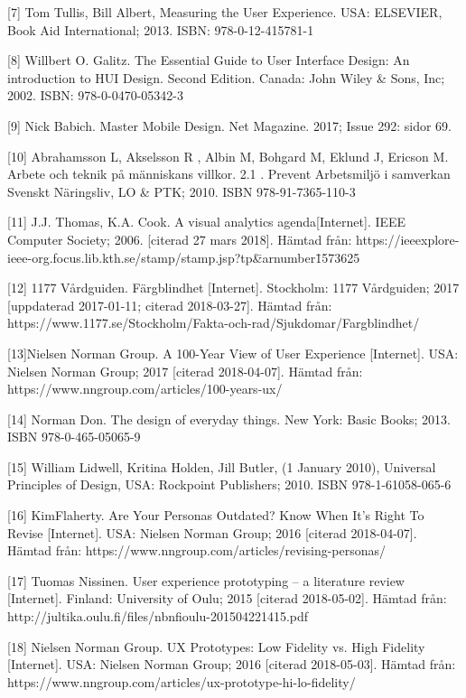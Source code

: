 \documentclass[12pt]{kththesis}
\begin{document}
[7] Tom Tullis, Bill Albert, Measuring the User Experience. USA: ELSEVIER, Book Aid International; 2013. ISBN: 978-0-12-415781-1

[8] Willbert O. Galitz. The Essential Guide to User Interface Design: An introduction to HUI Design. Second Edition. Canada: John Wiley \& Sons, Inc; 2002. ISBN: 978-0-0470-05342-3

[9] Nick Babich. Master Mobile Design. Net Magazine. 2017; Issue 292: sidor 69.         

[10] Abrahamsson L, Akselsson R , Albin M,  Bohgard M, Eklund J, Ericson M. Arbete och teknik på människans villkor. 2.1 . Prevent Arbetsmiljö i samverkan Svenskt Näringsliv, LO \& PTK; 2010. ISBN 978-91-7365-110-3

[11] J.J. Thomas, K.A. Cook. A visual analytics agenda[Internet]. IEEE Computer Society; 2006. [citerad 27 mars 2018]. Hämtad från: \newline
https://ieeexplore-ieee-org.focus.lib.kth.se\newline/stamp/stamp.jsp?tp\=\&arnumber\=1573625

[12] 1177 Vårdguiden. Färgblindhet [Internet]. Stockholm: 1177 Vårdguiden; 2017 [uppdaterad 2017-01-11; citerad 2018-03-27]. Hämtad från:\newline 
https://www.1177.se/Stockholm/Fakta-och-rad/Sjukdomar/Fargblindhet/

[13]Nielsen Norman Group. A 100-Year View of User Experience [Internet].  USA: Nielsen Norman Group; 2017 [citerad 2018-04-07]. Hämtad från:  https://www.nngroup.com/articles/100-years-ux/

[14] Norman Don. The design of everyday things. New York: Basic Books; 2013. ISBN 978-0-465-05065-9 

[15] William Lidwell, Kritina Holden, Jill Butler, (1 January 2010), Universal Principles of Design, USA: Rockpoint Publishers; 2010. ISBN 978-1-61058-065-6

[16] KimFlaherty. Are Your Personas Outdated? Know When It’s Right To Revise [Internet]. USA: Nielsen Norman Group; 2016 [citerad 2018-04-07]. Hämtad från:  https://www.nngroup.com/articles/revising-personas/ 

[17] Tuomas Nissinen. User experience prototyping – a literature review [Internet]. Finland: University of Oulu; 2015 [citerad 2018-05-02]. Hämtad från: http://jultika.oulu.fi/files/nbnfioulu-201504221415.pdf 

[18] Nielsen Norman Group. UX Prototypes: Low Fidelity vs. High Fidelity [Internet].  USA: Nielsen Norman Group; 2016 [citerad 2018-05-03]. Hämtad från: https://www.nngroup.com/articles/ux-prototype-hi-lo-fidelity/ 
\end{document}
